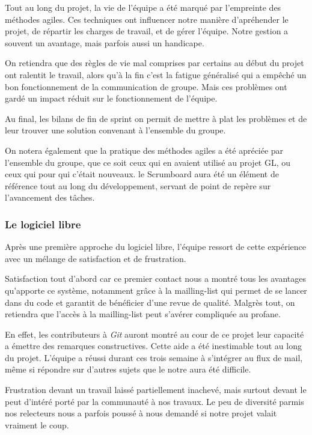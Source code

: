\documentclass[11pt]{article}
\begin{document}
Tout au long du projet, la vie de l'équipe a été marqué par l'empreinte des
méthodes agiles. Ces techniques ont influencer notre manière d'apréhender 
le projet, de répartir les charges de travail, et de gérer l'équipe. Notre
gestion a souvent un avantage, mais parfois aussi un handicape. 

On retiendra que des règles de vie mal comprises par certains au début du 
projet ont ralentit le travail, alors qu'à la fin c'est la fatigue généralisé
qui a empêché un bon fonctionnement de la communication de groupe. Mais ces
problèmes ont gardé un impact réduit sur le fonctionnement de l'équipe. 

Au final, les bilans de fin de sprint on permit de mettre à plat les problèmes
et de leur trouver une solution convenant à l'ensemble du groupe.

On notera également que la pratique des méthodes agiles a été apréciée par 
l'ensemble du groupe, que ce soit ceux qui en avaient utilisé au projet GL,
ou ceux qui pour qui c'était nouveaux. le Scrumboard aura été un élément de 
référence tout au long du développement, servant de point de repère sur 
l'avancement des tâches.

\subsubsection*{Le logiciel libre }

Après une première approche du logiciel libre, l'équipe ressort de cette 
expérience avec un mélange de satisfaction et de frustration.

Satisfaction tout d'abord car ce premier contact nous a montré tous les 
avantages qu'apporte ce système, notamment grâce à la mailling-list qui 
permet de se lancer dans du code et garantit de bénéficier d'une revue de
qualité. Malgrès tout, on retiendra que l'accès à la mailling-list peut 
s'avérer compliquée au profane.

En effet, les contributeurs à \textit{Git} auront montré au cour de ce 
projet leur capacité a émettre des remarques constructives. Cette aide
a été inestimable tout au long du projet. L'équipe a réussi durant ces
trois semaine à s'intégrer au flux de mail, même si répondre sur d'autres
sujets que le notre aura été difficile.

Frustration devant un travail laissé partiellement inachevé, mais surtout
devant le peut d'intéré porté par la communauté à nos travaux. Le peu de
diversité parmis nos relecteurs nous a parfois poussé à nous demandé si
notre projet valait vraiment le coup. 
\end{document}
